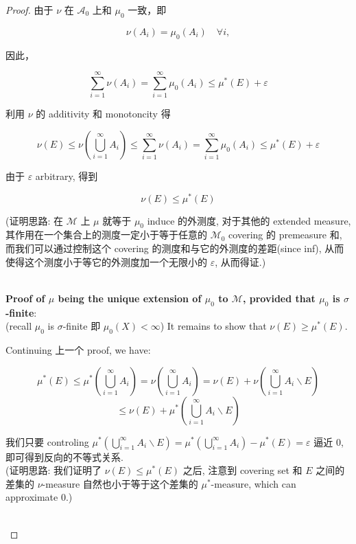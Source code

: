 \begin{proof}
由于 \(\nu\) 在 \(\mathcal{A}_{0}\) 上和 \(\mu_{0}\) 一致，即

\[\nu(A_{i}) = \mu_{0}(A_{i})\quad\forall i,\]

因此，

\[\sum\limits_{i = 1}^{\infty}\nu(A_{i}) = \sum\limits_{i = 1}^{\infty}\mu_{0}(A_{i}) \leq \mu^{\ast}(E) + \varepsilon\]

利用 \(\nu\) 的 additivity 和 monotoncity 得

\[\nu(E) \leq \nu(\bigcup\limits_{i = 1}^{\infty}A_{i}) \leq \sum\limits_{i = 1}^{\infty}\nu(A_{i}) = \sum\limits_{i = 1}^{\infty}\mu_{0}(A_{i}) \leq \mu^{\ast}(E) + \varepsilon\]

由于 \(\varepsilon\) arbitrary, 得到

\[\nu(E) \leq \mu^{\ast}(E)\]

(证明思路: 在 \(\mathcal{M}\) 上 \(\mu\) 就等于 \(\mu_{0}\) induce 的外测度, 对于其他的 extended measure, 其作用在一个集合上的测度一定小于等于任意的 \(\mathcal{M}_{0}\) covering 的 premeasure 和, 而我们可以通过控制这个 covering 的测度和与它的外测度的差距(since inf), 从而使得这个测度小于等它的外测度加一个无限小的 \(\varepsilon\), 从而得证.)\\
\strut \\
\textbf{Proof of \(\mu\) being the unique extension of \(\mu_{0}\) to \(\mathcal{M}\), provided that \(\mu_{0}\) is \(\sigma\)-finite}:\\
(recall \(\mu_{0}\) is \(\sigma\)-finite 即 \(\mu_{0}(X) < \infty\)) It remains to show that \(\nu(E) \geq \mu^{\ast}(E)\).

Continuing 上一个 proof, we have:

\[\mu^{\ast}(E) \leq \mu^{\ast}(\bigcup\limits_{i = 1}^{\infty}A_{i}) = \nu(\bigcup\limits_{i = 1}^{\infty}A_{i}) = \nu(E) + \nu(\bigcup\limits_{i = 1}^{\infty}A_{i}\backslash E)\]\[\leq \nu(E) + \mu^{\ast}(\bigcup\limits_{i = 1}^{\infty}A_{i}\backslash E)\]

我们只要 controling \(\mu^{\ast}(\bigcup_{i = 1}^{\infty}A_{i}\backslash E) = \mu^{\ast}(\bigcup_{i = 1}^{\infty}A_{i}) - \mu^{\ast}(E) = \varepsilon\) 逼近 0, 即可得到反向的不等式关系.\\
(证明思路: 我们证明了 \(\nu(E) \leq \mu^{\ast}(E)\) 之后, 注意到 covering set 和 \(E\) 之间的差集的 \(\nu\)-measure 自然也小于等于这个差集的 \(\mu^{\ast}\)-measure, which can approximate 0.)\\
\strut \\

\end{proof}

